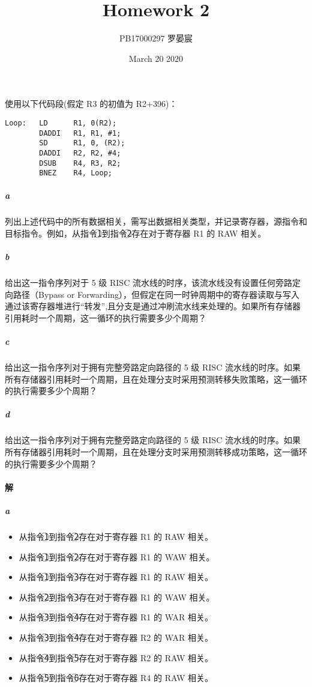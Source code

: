 \documentclass{article}
\title{Homework 2}
\author{PB17000297 罗晏宸}
\date{March 20 2020}
\begin{document}
\maketitle

\section{}
使用以下代码段(假定 R3 的初值为 R2+396)：

\begin{lstlisting}[language={[x86masm]Assembler}]
Loop:   LD      R1, 0(R2);
        DADDI   R1, R1, #1;
        SD      R1, 0, (R2);
        DADDI   R2, R2, #4;
        DSUB    R4, R3, R2;
        BNEZ    R4, Loop;
\end{lstlisting}
\subparagraph{a} 列出上述代码中的所有数据相关，需写出数据相关类型，并记录寄存器，源指令和目标指令。例如，从指令\textcircled{1}到指令\textcircled{2}存在对于寄存器 R1 的 RAW 相关。
\subparagraph{b} 给出这一指令序列对于 5 级 RISC 流水线的时序，该流水线没有设置任何旁路定向路径（Bypass or Forwarding），但假定在同一时钟周期中的寄存器读取与写入通过该寄存器堆进行“转发”,且分支是通过冲刷流水线来处理的。如果所有存储器引用耗时一个周期，这一循环的执行需要多少个周期？
\subparagraph{c} 给出这一指令序列对于拥有完整旁路定向路径的 5 级 RISC 流水线的时序。如果所有存储器引用耗时一个周期，且在处理分支时采用预测转移失败策略，这一循环的执行需要多少个周期？
\subparagraph{d} 给出这一指令序列对于拥有完整旁路定向路径的 5 级 RISC 流水线的时序。如果所有存储器引用耗时一个周期，且在处理分支时采用预测转移成功策略，这一循环的执行需要多少个周期？

\paragraph{解}
\subparagraph{a}
\begin{itemize}
    \item 从指令\textcircled{1}到指令\textcircled{2}存在对于寄存器 R1 的 RAW 相关。
    \item 从指令\textcircled{1}到指令\textcircled{2}存在对于寄存器 R1 的 WAW 相关。
    \item 从指令\textcircled{1}到指令\textcircled{3}存在对于寄存器 R1 的 RAW 相关。
    \item 从指令\textcircled{2}到指令\textcircled{3}存在对于寄存器 R1 的 WAW 相关。
    \item 从指令\textcircled{3}到指令\textcircled{4}存在对于寄存器 R1 的 WAR 相关。
    \item 从指令\textcircled{3}到指令\textcircled{4}存在对于寄存器 R2 的 WAR 相关。
    \item 从指令\textcircled{4}到指令\textcircled{5}存在对于寄存器 R2 的 RAW 相关。
    \item 从指令\textcircled{5}到指令\textcircled{6}存在对于寄存器 R4 的 RAW 相关。
\end{itemize}
\end{document}
